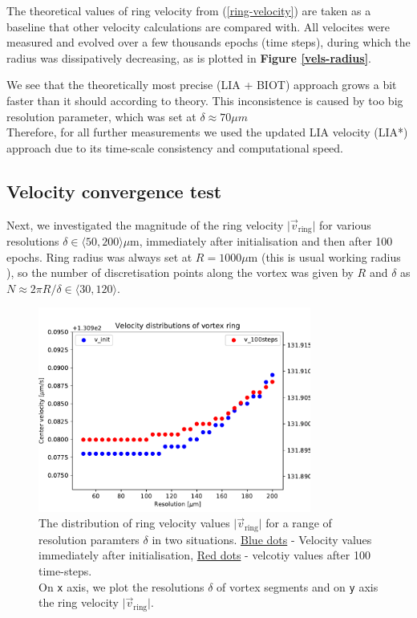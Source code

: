 The theoretical values of ring velocity from (\ref{ring-velocity}) are taken as a baseline that other velocity calculations are compared with.
All velocites were measured and evolved over a few thousands epochs (time steps), during which the radius was dissipatively decreasing, as is plotted in \textbf{Figure \ref{vels-radius}}.

We see that the theoretically most precise (LIA + BIOT) approach grows a bit faster than it should according to theory. This inconsistence is caused by too big resolution parameter, which was set at $\delta \approx 70 \mu \unit{m}$\\
Therefore, for all further measurements we used the updated LIA velocity (LIA*) approach due to its time-scale consistency and computational speed.


\subsection{Velocity convergence test}

Next, we investigated the magnitude of the ring velocity $\vert \vec{v}_{\text{ring}} \vert$ for various resolutions $\delta \in \langle 50, 200 \rangle \mu\text{m}$, immediately after initialisation and then after 100 epochs. Ring radius was always set at $R=1000\mu\text{m}$ (this is usual working radius \cite{tsubota} \cite{FDclosed}), so the number of discretisation points along the vortex was given by $R$ and $\delta$ as $N \approx 2\pi R/ \delta \in \langle 30,120 \rangle$.

\begin{figure}[h]
	\centering
	\includegraphics[width=0.8\textwidth]{graphics/results/vels_convergence}
	\caption{The distribution of ring velocity values $\vert \vec{v}_{\text{ring}} \vert$ for a range of resolution paramters $\delta$ in two situations. \underline{Blue dots} - Velocity values immediately after initialisation, \underline{Red dots} - velcotiy values after 100 time-steps.\\
	On \texttt{x} axis, we plot the resolutions $\delta$ of vortex segments and on \texttt{y} axis the ring velocity $\vert \vec{v}_{\text{ring}} \vert$.}
	\label{vels-converg}
\end{figure}

